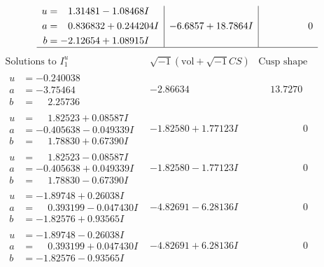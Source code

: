 \documentclass[1p]{elsarticle_modified}
\theoremstyle{definition}
\newcommand{\I}{\sqrt{-1}}
\begin{document}
$$\begin{array}{c|c|c}
\begin{aligned}
u &= \phantom{-}1.31481 - 1.08468 I \\
a &= \phantom{-}0.836832 + 0.244204 I \\
b &= -2.12654 + 1.08915 I\end{aligned}
 & -6.6857 + 18.7864 I & \phantom{-0.000000 } 0\\
 \hline 
 \end{array}$$\newpage$$\begin{array}{c|c|c}  
\text{Solutions to }I^u_{1}& \I (\text{vol} + \sqrt{-1}CS) & \text{Cusp shape}\\
 \hline 
\begin{aligned}
u &= -0.240038\phantom{ +0.000000I} \\
a &= -3.75464\phantom{ +0.000000I} \\
b &= \phantom{-}2.25736\phantom{ +0.000000I}\end{aligned}
 & -2.86634\phantom{ +0.000000I} & \phantom{-}13.7270\phantom{ +0.000000I} \\ \hline\begin{aligned}
u &= \phantom{-}1.82523 + 0.08587 I \\
a &= -0.405638 - 0.049339 I \\
b &= \phantom{-}1.78830 + 0.67390 I\end{aligned}
 & -1.82580 + 1.77123 I & \phantom{-0.000000 } 0 \\ \hline\begin{aligned}
u &= \phantom{-}1.82523 - 0.08587 I \\
a &= -0.405638 + 0.049339 I \\
b &= \phantom{-}1.78830 - 0.67390 I\end{aligned}
 & -1.82580 - 1.77123 I & \phantom{-0.000000 } 0 \\ \hline\begin{aligned}
u &= -1.89748 + 0.26038 I \\
a &= \phantom{-}0.393199 - 0.047430 I \\
b &= -1.82576 + 0.93565 I\end{aligned}
 & -4.82691 - 6.28136 I & \phantom{-0.000000 } 0 \\ \hline\begin{aligned}
u &= -1.89748 - 0.26038 I \\
a &= \phantom{-}0.393199 + 0.047430 I \\
b &= -1.82576 - 0.93565 I\end{aligned}
 & -4.82691 + 6.28136 I & \phantom{-0.000000 } 0 \\ \hline\begin{aligned}

\end{aligned}
\end{array}$$
\end{document}

